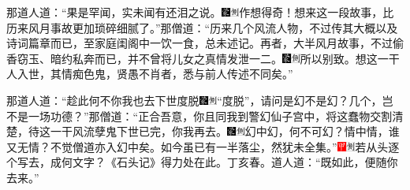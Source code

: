 那道人道：``果是罕闻，实未闻有还泪之说。{\includegraphics[width=3mm]{../Images/00006}\includegraphics[width=3mm]{../Images/00011}\footnotesize 作想得奇！}想来这一段故事，比历来风月事故更加琐碎细腻了。''那僧道：``历来几个风流人物，不过传其大概以及诗词篇章而已，至家庭闺阁中一饮一食，总未述记。再者，大半风月故事，不过偷香窃玉、暗约私奔而已，并不曾将儿女之真情发泄一二。{\includegraphics[width=3mm]{../Images/00006}\includegraphics[width=3mm]{../Images/00011}\footnotesize 所以别致。}想这一干人入世，其情痴色鬼，贤愚不肖者，悉与前人传述不同矣。''

那道人道：``趁此何不你我也去下世度脱{\includegraphics[width=3mm]{../Images/00006}\includegraphics[width=3mm]{../Images/00011}\footnotesize ``度脱''，请问是幻不是幻？}几个，岂不是一场功德？''那僧道：``正合吾意，你且同我到警幻仙子宫中，将这蠢物交割清楚，待这一干风流孽鬼下世已完，你我再去。{\includegraphics[width=3mm]{../Images/00006}\includegraphics[width=3mm]{../Images/00011}\footnotesize 幻中幻，何不可幻？情中情，谁又无情？不觉僧道亦入幻中矣。}如今虽已有一半落尘，然犹未全集。''{\includegraphics[width=3mm]{../Images/00002}\includegraphics[width=3mm]{../Images/00011}\footnotesize 若从头逐个写去，成何文字？《石头记》得力处在此。丁亥春。}道人道：``既如此，便随你去来。''

